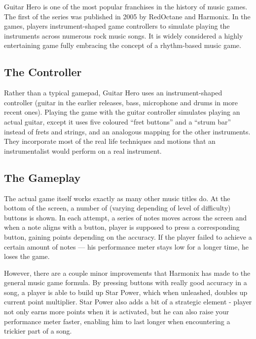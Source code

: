 Guitar Hero is one of the most popular franchises in the history of music games. The first of the series was published in 2005 by RedOctane and Harmonix. In the games, players instrument-shaped game controllers to simulate playing the instruments across numerous rock music songs. It is widely considered a highly entertaining game fully embracing the concept of a rhythm-based music game.

\vspace{10pt}


\subsection*{The Controller}


Rather than a typical gamepad, Guitar Hero uses an instrument-shaped controller (guitar in the earlier releases, bass, microphone and drums in more recent ones). Playing the game with the guitar controller simulates playing an actual guitar, except it uses five coloured ``fret buttons'' and a ``strum bar'' instead of frets and strings, and an analogous mapping for the other instruments. They incorporate most of the real life techniques and motions that an instrumentalist would perform on a real instrument.

\vspace{10pt}


\subsection*{The Gameplay}

The actual game itself works exactly as many other music titles do. At the bottom of the screen, a number of (varying depending of level of difficulty) buttons is shown. In each attempt, a series of notes moves across the screen and when a note aligns with a button, player is supposed to press a corresponding button, gaining points depending on the accuracy. If the player failed to achieve a certain amount of notes — his performance meter stays low for a longer time, he loses the game.

However, there are a couple minor improvements that Harmonix has made to the general music game formula. By pressing buttons with really good accuracy in a song, a player is able to build up Star Power, which when unleashed, doubles up current point multiplier. Star Power also adds a bit of a strategic element - player not only earns more points when it is activated, but he can also raise your performance meter faster, enabling him to last longer when encountering a trickier part of a song.

